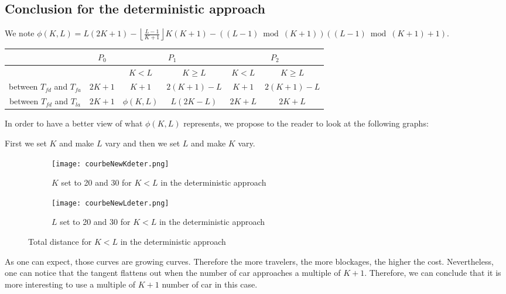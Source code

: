 \documentclass[letter-size, 11pt]{article}
\begin{document}
\subsection{Conclusion for the deterministic approach}
We note $\phi(K,L) = {L(2K + 1) - \left\lfloor \frac{L-1}{K+1} \right\rfloor K(K+1)- \left((L-1)\bmod(K+1)\right)\left((L-1)\bmod(K+1) + 1\right)}$.


\begin{center}
\begin{tabular}{|c|c|c|c|c|c|}
\hline
 & $P_0$ & \multicolumn{2}{c|}{$P_1$} & \multicolumn{2}{c|}{$P_2$} \\ 
 \hline
 & & $K<L$ & $K\geq L$ & $K<L$ & $K\geq L$\\ 
\hline
 between $T_{fd}$ and $T_{fa}$  & ${2K + 1}$ & ${K+1}$ & ${2(K+1)-L}$ & ${K+1}$ & ${2(K+1)-L}$     \\ 
\hline
between $T_{fd}$ and $ T_{la}$  & ${2K+1}$ & $\phi(K,L)$ & ${ L(2K - L)}$ & ${2K+L}$  & ${2K+L}$ \\ 
\hline
\end{tabular}
\end{center}

In order to have a better view of what $\phi(K,L)$ represents, we propose to the reader to look at the following graphs:

First we set $K$ and make $L$ vary and then we set $L$ and make $K$ vary.
\begin{figure*}
    \centering
    \begin{subfigure}[H]{0.475\textwidth}
            \texttt{[image: courbeNewKdeter.png]}
            \caption{$K$ set to 20 and 30 for $K<L$ in the deterministic approach}
            \label{a}
    \end{subfigure}
    \begin{subfigure}[H]{0.475\textwidth}
            \texttt{[image: courbeNewLdeter.png]}
            \caption{$L$ set to 20 and 30 for $K<L$ in the deterministic approach}
            \label{b}
    \end{subfigure}
    \caption{Total distance for $K<L$ in the deterministic approach}\label{fig:ABCD}
\end{figure*}



As one can expect, those curves are growing curves. Therefore the more travelers, the more blockages, the higher the cost. Nevertheless, one can notice that the tangent flattens out when the number of car approaches a multiple of $K+1$. Therefore, we can conclude that it is more interesting to use a multiple of $K+1$ number of car in this case.  
\end{document}
